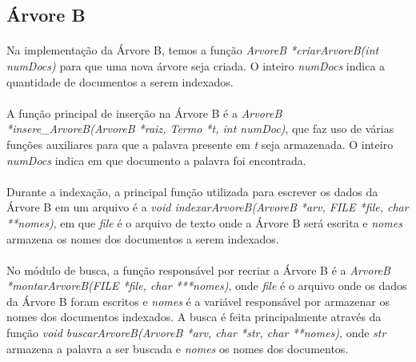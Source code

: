 \documentclass[12pt,a4paper]{article}
\begin{document}
  \subsection{Árvore B}
   {\paragraph{} Na implementação da Árvore B, temos a função \emph{ArvoreB *criarArvoreB(int numDocs)} para que uma nova árvore
   seja criada. O inteiro \emph{numDocs} indica a quantidade de documentos a serem indexados. }
   {\paragraph{} A função principal de inserção na Árvore B é a \emph{ArvoreB *insere\_ArvoreB(ArvoreB *raiz, Termo *t, int numDoc)}, que
   faz uso de várias funções auxiliares para que a palavra presente em \emph{t} seja armazenada. O inteiro \emph{numDocs} indica
   em que documento a palavra foi encontrada. }
   {\paragraph{} Durante a indexação, a principal função utilizada para escrever os dados da Árvore B em um arquivo é a \emph{void indexarArvoreB(ArvoreB *arv, FILE *file, char **nomes)},
   em que \emph{file} é o arquivo de texto onde a Árvore B será escrita e \emph{nomes} armazena os nomes dos documentos a serem
   indexados. }
   {\paragraph{} No módulo de busca, a função responsável por recriar a Árvore B é a \emph{ArvoreB *montarArvoreB(FILE *file, char ***nomes)},
   onde \emph{file} é o arquivo onde os dados da Árvore B foram escritos e \emph{nomes} é a variável responsável por armazenar os nomes
   dos documentos indexados. A busca é feita principalmente através da função \emph{void buscarArvoreB(ArvoreB *arv, char *str, char **nomes)}, 
   onde \emph{str} armazena a palavra a ser buscada e \emph{nomes} os nomes dos documentos. }
   
\end{document}
